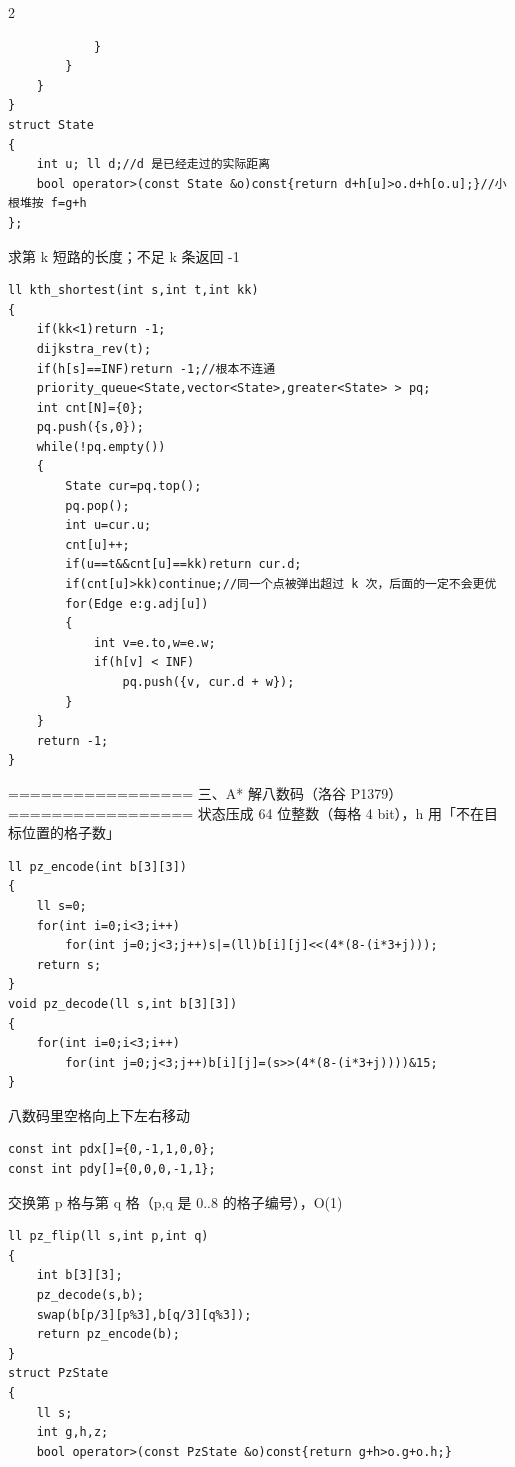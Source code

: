 \documentclass[UTF8,fontset=fandol,a4paper,twoside]{ctexart}
\newcommand{\note}[1]{{\fontsize{10}{12}\selectfont #1\par}}
\begin{document}
\begin{multicols}{2}
\begin{lstlisting}
            }
        }
    }
}
struct State
{
    int u; ll d;//d 是已经走过的实际距离
    bool operator>(const State &o)const{return d+h[u]>o.d+h[o.u];}//小根堆按 f=g+h
};
\end{lstlisting}
\note{求第 k 短路的长度；不足 k 条返回 -\allowbreak{}1}
\begin{lstlisting}
ll kth_shortest(int s,int t,int kk)
{
    if(kk<1)return -1;
    dijkstra_rev(t);
    if(h[s]==INF)return -1;//根本不连通
    priority_queue<State,vector<State>,greater<State> > pq;
    int cnt[N]={0};
    pq.push({s,0});
    while(!pq.empty())
    {
        State cur=pq.top();
        pq.pop();
        int u=cur.u;
        cnt[u]++;
        if(u==t&&cnt[u]==kk)return cur.d;
        if(cnt[u]>kk)continue;//同一个点被弹出超过 k 次，后面的一定不会更优
        for(Edge e:g.adj[u])
        {
            int v=e.to,w=e.w;
            if(h[v] < INF)
                pq.push({v, cur.d + w});
        }
    }
    return -1;
}
\end{lstlisting}
\note{=\allowbreak{}=\allowbreak{}=\allowbreak{}=\allowbreak{}=\allowbreak{}=\allowbreak{}=\allowbreak{}=\allowbreak{}=\allowbreak{}=\allowbreak{}=\allowbreak{}=\allowbreak{}=\allowbreak{}=\allowbreak{}=\allowbreak{}=\allowbreak{}=\allowbreak{} 三、A* 解八数码（洛谷 P1379）=\allowbreak{}=\allowbreak{}=\allowbreak{}=\allowbreak{}=\allowbreak{}=\allowbreak{}=\allowbreak{}=\allowbreak{}=\allowbreak{}=\allowbreak{}=\allowbreak{}=\allowbreak{}=\allowbreak{}=\allowbreak{}=\allowbreak{}=\allowbreak{}=\allowbreak{} 状态压成 64 位整数（每格 4 bit），h 用「不在目标位置的格子数」}
\begin{lstlisting}
ll pz_encode(int b[3][3])
{
    ll s=0;
    for(int i=0;i<3;i++)
        for(int j=0;j<3;j++)s|=(ll)b[i][j]<<(4*(8-(i*3+j)));
    return s;
}
void pz_decode(ll s,int b[3][3])
{
    for(int i=0;i<3;i++)
        for(int j=0;j<3;j++)b[i][j]=(s>>(4*(8-(i*3+j))))&15;
}
\end{lstlisting}
\note{八数码里空格向上下左右移动}
\begin{lstlisting}
const int pdx[]={0,-1,1,0,0};
const int pdy[]={0,0,0,-1,1};
\end{lstlisting}
\note{交换第 p 格与第 q 格（p,\allowbreak{}q 是 0.\allowbreak{}.\allowbreak{}8 的格子编号），O(\allowbreak{}1)\allowbreak{}}
\begin{lstlisting}
ll pz_flip(ll s,int p,int q)
{
    int b[3][3];
    pz_decode(s,b);
    swap(b[p/3][p%3],b[q/3][q%3]);
    return pz_encode(b);
}
struct PzState
{
    ll s;
    int g,h,z;
    bool operator>(const PzState &o)const{return g+h>o.g+o.h;}

\end{lstlisting}
\end{multicols}
\end{document}
